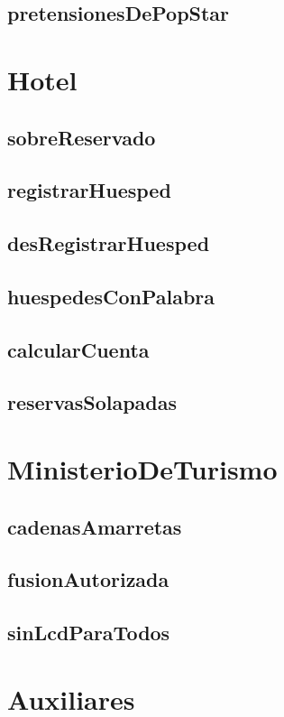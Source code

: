 \documentclass[a4paper]{article}
\begin{document}
\subsection{pretensionesDePopStar}


\newpage

\section{Hotel}


\subsection{sobreReservado}


\subsection{registrarHuesped}


\subsection{desRegistrarHuesped}


\subsection{huespedesConPalabra}


\subsection{calcularCuenta}


\subsection{reservasSolapadas}


\newpage

\section{MinisterioDeTurismo}


\subsection{cadenasAmarretas}


\subsection{fusionAutorizada}


\subsection{sinLcdParaTodos}


\newpage

\section{Auxiliares}

\end{document}
